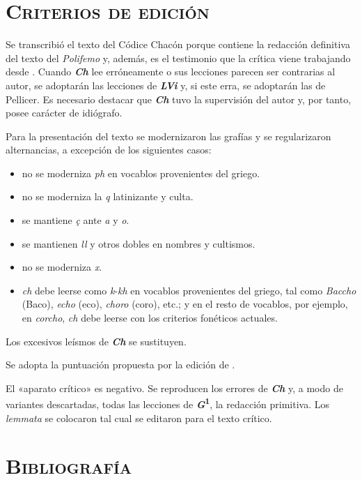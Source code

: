 \documentclass[11pt,twoside]{article}
\newcommand{\ch}{\emph{\textbf{Ch}}}
\newcommand{\guno}{\textbf{\emph{G}\textsuperscript{1}}}
\newcommand{\lvi}{\emph{\textbf{LVi}}}
\begin{document}
\section*{\raggedleft\textsc{Criterios de edición}}
%
\noindent Se transcribió el texto del Códice Chacón porque contiene la redacción definitiva del texto del \emph{Polifemo} y, además, es el testimonio que la crítica viene trabajando desde \textcite{Fouché-Delbosc1900}. Cuando {\ch} lee erróneamente o sus lecciones parecen ser contrarias al autor, se adoptarán las lecciones de {\lvi} y, si este erra, se adoptarán las de Pellicer. Es necesario destacar que {\ch} tuvo la supervisión del autor y, por tanto, posee carácter de idiógrafo.\par
%
Para la presentación del texto se modernizaron las grafías y se regula\-rizaron alternancias, a excepción de los siguientes casos:
%
\begin{itemize}[label=--]%
\item no se moderniza \emph{ph} en vocablos provenientes del griego.
\item no se moderniza la \emph{q} latinizante y culta.
\item se mantiene \emph{ç} ante \emph{a} y \emph{o}. 
\item se mantienen \emph{ll} y otros dobles en nombres y cultismos.
\item no se moderniza \emph{x}.
\item \emph{ch} debe leerse como \emph{k}-\emph{kh} en vocablos provenientes del griego, tal como \emph{Baccho} (Baco), \emph{echo} (eco), \emph{choro} (coro), etc.; y en el resto de vocablos, por ejemplo, en \emph{corcho}, \emph{ch} debe leerse con los criterios fonéticos actuales.
\end{itemize}\par
%
Los excesivos leísmos de {\ch} se sustituyen.\par
%
Se adopta la puntuación propuesta por la edición de \textcite{Alonso1967}.\par
%
El «aparato crítico» es negativo. Se reproducen los errores de {\ch} y, a modo de variantes descartadas, todas las lecciones de {\guno}, la redacción primitiva. Los \emph{lemmata} se colocaron tal cual se editaron para el texto crítico.\par
\repage
%
\section*{\raggedleft\textsc{Bibliografía}}
\nocite{*}
\printbibliography[heading=none]
\newpage
%
\setcounter{page}{1}
\end{document}
